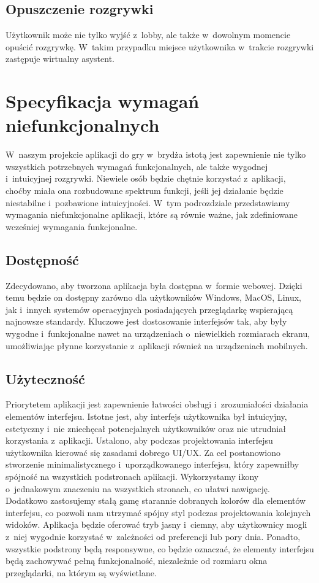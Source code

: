 \subsection{Opuszczenie rozgrywki}
Użytkownik może nie tylko wyjść z~lobby, ale także w~dowolnym momencie
opuścić rozgrywkę. W~takim przypadku miejsce użytkownika w~trakcie
rozgrywki zastępuje wirtualny asystent.




\section{Specyfikacja wymagań niefunkcjonalnych}
W~naszym projekcie aplikacji do gry w~brydża
istotą jest zapewnienie nie tylko wszystkich potrzebnych wymagań
funkcjonalnych, ale także wygodnej i~intuicyjnej rozgrywki. Niewiele osób
będzie chętnie korzystać z~aplikacji, choćby miała ona rozbudowane
spektrum funkcji, jeśli jej działanie będzie niestabilne i~pozbawione
intuicyjności. W~tym podrozdziale przedstawiamy wymagania
niefunkcjonalne aplikacji, które są równie ważne, jak zdefiniowane
wcześniej wymagania funkcjonalne.


\subsection{Dostępność}
Zdecydowano, aby tworzona aplikacja była dostępna w~formie webowej.
Dzięki temu będzie on dostępny zarówno dla użytkowników
Windows, MacOS, Linux, jak i~innych systemów operacyjnych posiadających
przeglądarkę wspierającą najnowsze standardy.
Kluczowe jest dostosowanie interfejsów tak,
aby były wygodne i~funkcjonalne nawet na urządzeniach o~niewielkich
rozmiarach ekranu, umożliwiając płynne korzystanie z~aplikacji również
na urządzeniach mobilnych.


\subsection{Użyteczność}
Priorytetem aplikacji jest zapewnienie łatwości obsługi
i~zrozumiałości działania elementów interfejsu.
Istotne jest, aby interfejs użytkownika
był intuicyjny, estetyczny i~nie zniechęcał potencjalnych użytkowników
oraz nie utrudniał korzystania z~aplikacji. Ustalono, aby podczas
projektowania interfejsu użytkownika kierować się zasadami
dobrego UI/UX.
Za cel postanowiono stworzenie minimalistycznego i~uporządkowanego
interfejsu, który zapewniłby spójność na wszystkich podstronach aplikacji.
Wykorzystamy ikony o~jednakowym znaczeniu na wszystkich stronach,
co ułatwi nawigację. Dodatkowo zastosujemy stałą gamę starannie
dobranych kolorów dla elementów interfejsu, co pozwoli nam utrzymać
spójny styl podczas projektowania kolejnych widoków. Aplikacja
będzie oferować tryb jasny i~ciemny, aby użytkownicy mogli z~niej
wygodnie korzystać w~zależności od preferencji lub pory dnia.
Ponadto, wszystkie podstrony będą responsywne, co będzie oznaczać,
że elementy interfejsu będą zachowywać pełną funkcjonalność,
niezależnie od rozmiaru okna przeglądarki, na którym są wyświetlane.

